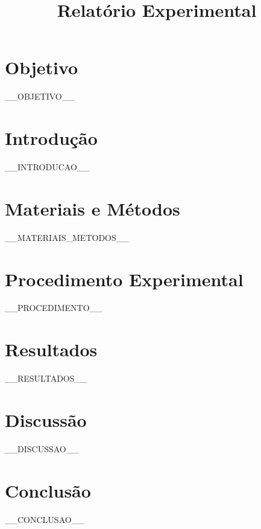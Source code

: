 \documentclass[a4paper,12pt]{article}
\title{Relatório Experimental}
\author{}
\date{}
\begin{document}
\maketitle

\section*{Objetivo}
__OBJETIVO__

\section*{Introdução}
__INTRODUCAO__

\section*{Materiais e Métodos}
__MATERIAIS_METODOS__

\section*{Procedimento Experimental}
__PROCEDIMENTO__

\section*{Resultados}
__RESULTADOS__

\section*{Discussão}
__DISCUSSAO__

\section*{Conclusão}
__CONCLUSAO__

\printbibliography[title={Referências}]  %
\end{document}
